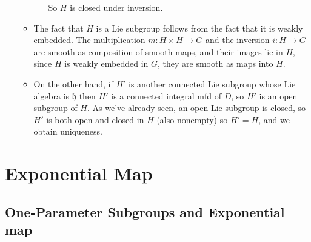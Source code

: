\documentclass{report}
\theoremstyle{definition}
\begin{document}
\begin{itemize}
\begin{itemize}
\begin{itemize}
            So $H$ is closed under inversion.
        \end{itemize}
        \item The fact that $H$ is a Lie subgroup follows from the fact that it is weakly embedded. The multiplication $m:H\times H\to G$ and the inversion $i:H\to G$ are smooth as composition of smooth maps, and their images lie in $H$, since $H$ is weakly embedded in $G$, they are smooth as maps into $H$.
        \item On the other hand, if $H'$ is another connected Lie subgroup whose Lie algebra is $\mathfrak{h}$ then $H'$ is a connected integral mfd of $D$, so $H'$ is an open subgroup of $H$. As we've already seen, an open Lie subgroup is closed, so $H'$ is both open and closed in $H$ (also nonempty) so $H'=H$, and we obtain uniqueness.
    \end{itemize}
\end{itemize}

\section{Exponential Map}

\subsection{One-Parameter Subgroups and Exponential map}
\end{document}
